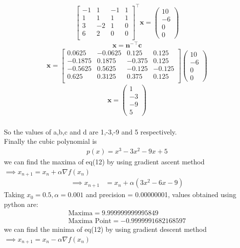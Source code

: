 \documentclass[10pt, a4paper]{article}
\providecommand{\brak}[1]{\ensuremath{\left(#1\right)}}
\newcommand{\myvec}[1]{\ensuremath{\begin{pmatrix}#1\end{pmatrix}}}
\let\vec\mathbf
\begin{document}
$$ 
\begin{bmatrix}
-1 & 1 & -1 & 1\\
 1 & 1 & 1 & 1\\
 3 &-2 & 1 & 0\\
 6 & 2 & 0 & 0\\
\end{bmatrix}^\top \vec{x} = \myvec{10\\-6\\0\\0}
$$
\begin{align}
\vec{x} = \vec{n^-}^\top \vec{c}
\end{align}
$$
\vec{x} = \begin{bmatrix}
0.0625 & -0.0625 & 0.125 & 0.125\\
-0.1875 & 0.1875 &-0.375 & 0.125\\
-0.5625 & 0.5625 & -0.125 & -0.125\\
 0.625 & 0.3125 & 0.375 & 0.125\\
\end{bmatrix}\myvec{10\\-6\\0\\0}
	$$
\begin{align}
\vec{x} = \myvec{1\\-3\\-9\\5}
\end{align}\\
So the values of a,b,c and d are 1,-3,-9 and 5 respectively.\\
Finally the cubic polynomial is\\ 
\begin{align}
p(x)=x^3 - 3x^2  - 9x + 5
\end{align}
 we can find the maxima of eq(12) by using gradient ascent method 
$\implies x_{n+1} = x_n + \alpha \nabla f(x_n) $\\
 \begin{align}
        \implies x_{n+1} &= x_n + \alpha \brak{3x^2 - 6x - 9}
    \end{align}
 Taking $x_0=0.5,\alpha=0.001$ and precision = 0.00000001, values obtained using python are:
    \begin{align}
        \boxed{\text{Maxima} = 9.999999999995849}\\
        \boxed{\text{Maxima Point} = -0.9999991682168597}
    \end{align}
 we can find the minima of eq(12) by using gradient descent method
 $\implies x_{n+1} = x_n - \alpha \nabla f(x_n) $\\
\end{document}
